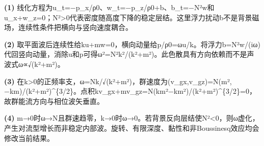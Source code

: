 \par\noindent\textbf{(1)} 线化方程为u\_t=−p\_x/ρ0、w\_t=−p\_z/ρ0+b、b\_t=−N²w和u\_x+w\_z=0；N²>0代表密度随高度下降的稳定层结。这里浮力扰动b不是背景磁场，连续性条件把横向与竖向速度耦合。
\par\noindent\textbf{(2)} 取平面波后连续性给ku+mw=0，横向动量给p/ρ0=ωu/k。将浮力b=N²w/(iω)代回竖向动量，消除u和p可得ω²=N²k²/(k²+m²)。此色散具有方向依赖而不是声波式ω∝√(k²+m²)。
\par\noindent\textbf{(3)} 在k>0的正频率支，ω=Nk/√(k²+m²)，群速度为(v\_gx,v\_gz)=N(m²,−km)/(k²+m²)\textasciicircum{}\{3/2\}。点积kv\_gx+mv\_gz=N(km²−km²)/(k²+m²)\textasciicircum{}\{3/2\}=0，故群能流方向与相位波矢垂直。
\par\noindent\textbf{(4)} m→0时ω→N且群速趋零，k→0时ω→0。若背景反向层结使N²<0，则ω虚化，产生对流型增长而非稳定内部波。旋转、有限深度、黏性和非Boussinesq效应均会修改当前结果。
